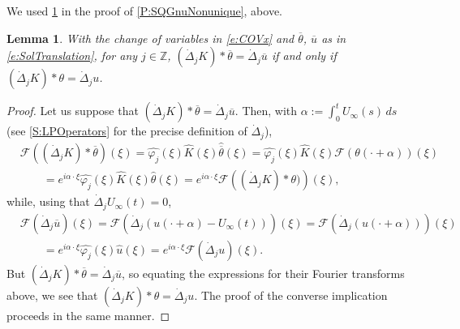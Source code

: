 \documentclass[11pt,reqno,xcolor=svgnames]{amsart}
\def\Z{{\mathbb Z}}
\theoremstyle{plain}
\newtheorem{lemma}[theorem]{Lemma}
\theoremstyle{definition}
\theoremstyle{plain}
\theoremstyle{remark}
\newcommand{\iny}{\ensuremath{\infty}}
\newcommand{\pr}[1]{\ensuremath{\left( #1 \right) }}
\newcommand{\Cal}[1]{\ensuremath{\mathcal{#1}}}
\newcommand{\wh}{\widehat}
\newcommand{\al}{\alpha}
\newcommand{\FTF}
    {\Cal{F}}
\newcommand{\ol}{\overline}
\newcommand{\Del}{\dot{\Delta}}
\newcommand{\ou}{\ol{u}}
\begin{document}
We used \cref{L:ConstitutiveTranslated} in the proof of \cref{P:SQGnuNonunique}, above.
\begin{lemma}\label{L:ConstitutiveTranslated}
	With the change of variables in \cref{e:COVx} and
	$\ol{\theta}$, $\ou$ as in \cref{e:SolTranslation},
	for any $j \in \Z$,
	$(\Del_j K) * \ol{\theta} = \Del_j \ou$ if and only if
	$(\Del_j K) * \theta = \Del_j u$.
\end{lemma}
\begin{proof}
Let us suppose that
$(\Del_j K) * \ol{\theta} = \Del_j \ou$.
Then, with $\al := \int_0^t U_\iny(s) \, ds$ (see \cref{S:LPOperators} for the precise definition of $\Del_j$),
\begin{align*}
	&\FTF \pr{(\Del_j K) * \ol{\theta}}(\xi)
		= \wh{\varphi_j}(\xi) \wh{K}(\xi)
			\wh{\ol{\theta}}(\xi)
		= \wh{\varphi_j}(\xi) \wh{K}(\xi)
			\FTF \pr{\theta(\cdot + \al)}(\xi) \\
		&\qquad
		= e^{i \al \cdot \xi} \wh{\varphi_j}(\xi) \wh{K}(\xi)
				\wh{\theta}(\xi)
		= e^{i \al \cdot \xi} \FTF \pr{(\Del_j K) * \theta)}(\xi),
\end{align*}
while, using that $\Del_j U_\iny(t) = 0$,
\begin{align*}
	&\FTF \pr{\Del_j \ol{u}}(\xi)
		= \FTF \pr{\Del_j (u(\cdot + \al) - U_\iny(t))}(\xi)
		= \FTF \pr{\Del_j (u(\cdot + \al))}(\xi) \\
		&\qquad
		= e^{i \al \cdot \xi}
			\wh{\varphi_j} (\xi) \wh{u}(\xi) 
		= e^{i \al \cdot \xi} \FTF \pr{\Del_j u}(\xi).
\end{align*}
But $(\Del_j K) * \ol{\theta} = \Del_j \ou$, so equating the expressions for their Fourier transforms above, we see that $(\Del_j K) * \theta = \Del_j u$. The proof of the converse implication proceeds in the same manner.
\end{proof}
\end{document}
